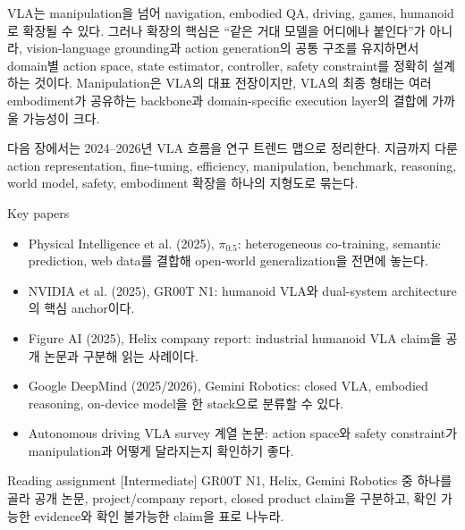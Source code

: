 VLA는 manipulation을 넘어 navigation, embodied QA, driving, games, humanoid로 확장될 수 있다. 그러나 확장의 핵심은 ``같은 거대 모델을 어디에나 붙인다''가 아니라, vision-language grounding과 action generation의 공통 구조를 유지하면서 domain별 action space, state estimator, controller, safety constraint를 정확히 설계하는 것이다. Manipulation은 VLA의 대표 전장이지만, VLA의 최종 형태는 여러 embodiment가 공유하는 backbone과 domain-specific execution layer의 결합에 가까울 가능성이 크다.

다음 장에서는 2024--2026년 VLA 흐름을 연구 트렌드 맵으로 정리한다. 지금까지 다룬 action representation, fine-tuning, efficiency, manipulation, benchmark, reasoning, world model, safety, embodiment 확장을 하나의 지형도로 묶는다.

\begin{sourcebox}{Key papers}
\begin{itemize}
  \item Physical Intelligence et al. (2025), \(\pi_{0.5}\): heterogeneous co-training, semantic prediction, web data를 결합해 open-world generalization을 전면에 놓는다.
  \item NVIDIA et al. (2025), GR00T N1: humanoid VLA와 dual-system architecture의 핵심 anchor이다.
  \item Figure AI (2025), Helix company report: industrial humanoid VLA claim을 공개 논문과 구분해 읽는 사례이다.
  \item Google DeepMind (2025/2026), Gemini Robotics: closed VLA, embodied reasoning, on-device model을 한 stack으로 분류할 수 있다.
  \item Autonomous driving VLA survey 계열 논문: action space와 safety constraint가 manipulation과 어떻게 달라지는지 확인하기 좋다.
\end{itemize}
\end{sourcebox}

\begin{assignmentbox}{Reading assignment [Intermediate]}
GR00T N1, Helix, Gemini Robotics 중 하나를 골라 공개 논문, project/company report, closed product claim을 구분하고, 확인 가능한 evidence와 확인 불가능한 claim을 표로 나누라.
\end{assignmentbox}
